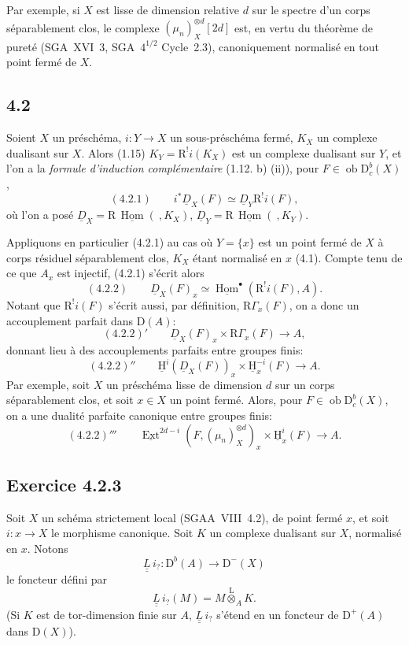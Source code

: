 \documentclass[11pt]{article}
\providecommand{\uH}{\underline{\mathrm H}}
\DeclareMathOperator{\Hom}{Hom}
\DeclareMathOperator{\Ext}{Ext}
\newcommand{\R}{\mathrm{R}}\newcommand{\RHomCore}{\mathrm{RHom}}
\newcommand{\D}{\mathrm{D}}
\newcommand{\ob}{\operatorname{ob}}
\providecommand{\Hom}{\operatorname{Hom}}
\providecommand{\ob}{\operatorname{ob}}
\providecommand{\R}{\mathrm R}
\providecommand{\Hom}{\operatorname{Hom}}
\begin{document}
Par
exemple, si $X$ est lisse de dimension relative $d$ sur le spectre d'un corps séparablement clos, le complexe $(\mu_n)_X^{\otimes d}[2d]$ est, en vertu du théorème de pureté (SGA~XVI~3, SGA~$4^{1/2}$ Cycle~2.3), canoniquement normalisé en tout point fermé de $X$.

\subsection*{4.2}
Soient $X$ un préschéma, $i:Y\to X$ un sous-préschéma fermé, $K_X$ un complexe dualisant sur $X$. Alors (1.15) $K_Y=\R^{!}i(K_X)$ est un complexe dualisant sur $Y$, et l'on a la \emph{formule d'induction complémentaire} (1.12. b) (ii)), pour $F\in \ob\D_c^b(X)$,
\[
(4.2.1)\qquad i^*\underline{D}_X(F)\simeq\underline{D}_Y\R^{!}i(F),
\]
où l'on a posé $\underline{D}_X=\R\,\underline{\Hom}(\ ,K_X)$, $\underline{D}_Y=\R\,\underline{\Hom}(\ ,K_Y)$.

Appliquons en particulier (4.2.1) au cas où $Y=\{x\}$ est un point fermé de $X$ à corps résiduel séparablement clos, $K_X$ étant normalisé en $x$ (4.1). Compte tenu de ce que $A_x$ est injectif, (4.2.1) s'écrit alors
\[
(4.2.2)\qquad \underline{D}_X(F)_x\simeq\underline{\Hom}^{\bullet}(\R^{!}i(F),A).
\]
Notant que $\R^{!}i(F)$ s'écrit aussi, par définition, $\R\Gamma_x(F)$, on a donc un accouplement parfait dans $\D(A)$:
\[
(4.2.2)'\qquad \underline{D}_X(F)_x\times \R\Gamma_x(F)\longrightarrow A,
\]
donnant lieu à des accouplements parfaits entre groupes finis:
\[
(4.2.2)''\qquad \uH^i(\underline{D}_X(F))_x\times \uH_x^{-i}(F)\longrightarrow A.
\]
Par exemple, soit $X$ un préschéma lisse de dimension $d$ sur un corps séparablement clos, et soit $x\in X$ un point fermé. Alors, pour $F\in\ob\D_c^b(X)$, on a une dualité parfaite canonique entre groupes finis:
\[
(4.2.2)'''\qquad \underline{\Ext}^{2d-i}(F,(\mu_n)_X^{\otimes d})_x\times \uH_x^i(F)\longrightarrow A.
\]

\subsection*{Exercice 4.2.3}
Soit $X$ un schéma strictement local (SGAA~VIII~4.2), de point fermé $x$, et soit $i:x\to X$ le morphisme canonique. %
Soit $K$ un complexe dualisant sur $X$, normalisé en $x$. Notons
\[
\underline{\underline{L}}\, i_? : \D^b(A)\longrightarrow \D^-(X)
\]
le foncteur défini par
\[
\underline{\underline{L}}\, i_?(M)=M\overset{\mathrm{L}}{\otimes}_A K.
\]
(Si $K$ est de tor-dimension finie sur $A$, $\underline{\underline{L}}\, i_?$ s'étend en un foncteur de $\D^+(A)$ dans $\D(X)$).
\end{document}

